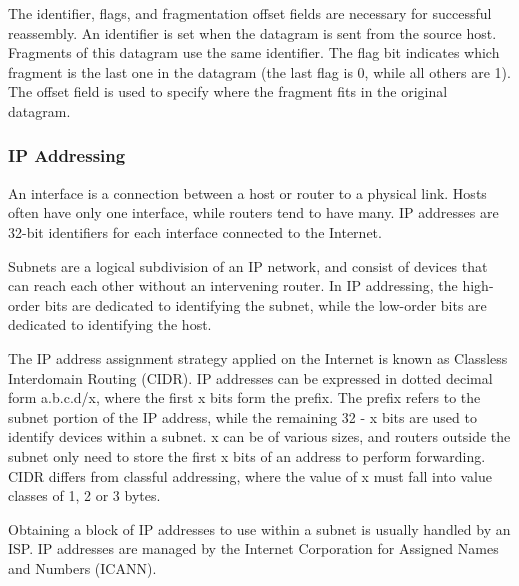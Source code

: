 \documentclass[12pt,titlepage]{article}
\begin{document}
        The identifier, flags, and fragmentation offset fields are necessary for successful reassembly. An identifier is set when the datagram is sent from
        the source host. Fragments of this datagram use the same identifier. The flag bit indicates which fragment is the last one in the datagram
        (the last flag is 0, while all others are 1). The offset field is used to specify where the fragment fits in the original datagram.

      \subsubsection{IP Addressing}
        An interface is a connection between a host or router to a physical link. Hosts often have only one interface, while routers tend to have many.
        IP addresses are 32-bit identifiers for each interface connected to the Internet.

        Subnets are a logical subdivision of an IP network, and consist of devices that can reach each other without an intervening router. In IP addressing,
        the high-order bits are dedicated to identifying the subnet, while the low-order bits are dedicated to identifying the host.

        The IP address assignment strategy applied on the Internet is known as Classless Interdomain Routing (CIDR). IP addresses can be expressed in dotted
        decimal form a.b.c.d/x, where the first x bits form the prefix. The prefix refers to the subnet portion of the IP address, while the remaining
        32 - x bits are used to identify devices within a subnet. x can be of various sizes, and routers outside the subnet only need to store the first x bits
        of an address to perform forwarding. CIDR differs from classful addressing, where the value of x must fall into value classes of 1, 2 or 3 bytes.

        Obtaining a block of IP addresses to use within a subnet is usually handled by an ISP. IP addresses are managed by the Internet Corporation for
        Assigned Names and Numbers (ICANN).
\end{document}
